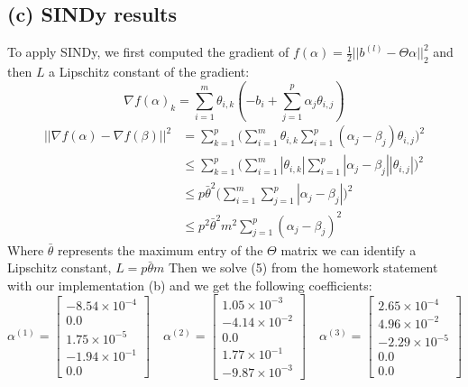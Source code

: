 \documentclass{article}
\begin{document}
\subsection*{(c) SINDy results}
To apply SINDy, we first computed the gradient of $f(\alpha) = \frac{1}{2}||b^{(l)} -
\Theta\alpha||_2^2$ and then $L$ a Lipschitz constant of the gradient:
$$ \nabla f(\alpha)_k = \sum_{i=1}^{m}\theta_{i,k}(-b_i + \sum_{j=1}^{p}\alpha_j
\theta_{i,j})$$
\begin{align*}
||\nabla f(\alpha) - \nabla f(\beta)||^2 & = \sum_{k=1}^{p}\Big(\sum_{i=1}^{m}
  \theta_{i,k} \sum_{i=1}^{p}(\alpha_j-\beta_j)\theta_{i,j}\Big)^2 \\
                                       & \leq \sum_{k=1}^{p}\Big(\sum_{i=1}^{m}
  |\theta_{i,k}| \sum_{i=1}^{p}|\alpha_j-\beta_j||\theta_{i,j}|\Big)^2 \\
                                       & \leq p\bar{\theta}^2\Big(\sum_{i=1}^{m}\sum
                                       _{j=1}^{p}|\alpha_j - \beta_j|\Big)^2 \\
                                       & \leq p^2\bar{\theta}^2m^2\sum_{j=1}^{p}(\alpha_j -
                                       \beta_j)^2
\end{align*}
Where $\bar{\theta}$ represents the maximum entry of the $\Theta$ matrix we can identify a 
Lipschitz constant, $L = p\bar{\theta}m$
Then we solve (5) from the homework statement with our implementation (b) and we get the 
following coefficients: \\
\[
\alpha^{(1)} = \begin{bmatrix}
-8.54 \times 10^{-4} \\
0.0 \\
1.75 \times 10^{-5} \\
-1.94 \times 10^{-1} \\
0.0
\end{bmatrix}
\quad
\alpha^{(2)} = \begin{bmatrix}
1.05 \times 10^{-3} \\
-4.14 \times 10^{-2} \\
0.0 \\
1.77 \times 10^{-1} \\
-9.87 \times 10^{-3}
\end{bmatrix}
\quad
\alpha^{(3)} = \begin{bmatrix}
2.65 \times 10^{-4} \\
4.96 \times 10^{-2} \\
-2.29 \times 10^{-5} \\
0.0 \\
0.0
\end{bmatrix}
\]
\end{document}
